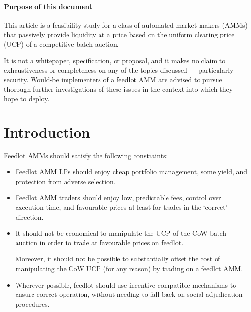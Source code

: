 \documentclass[a4paper,10pt]{article}
\begin{document}
\maketitle
\printsplash

\paragraph{Purpose of this document}

This article is a feasibility study for a class of automated market makers (AMMs) that passively provide liquidity at a price based on the uniform clearing price (UCP) of a competitive batch auction.

It is not a whitepaper, specification, or proposal, and it makes no claim to exhaustiveness or completeness on any of the topics discussed --- particularly security. 
%
Would-be implementers of a feedlot AMM are advised to pursue thorough further investigations of these issues in the context into which they hope to deploy.

\newpage
\section{Introduction}

Feedlot AMMs should satisfy the following constraints:
\begin{itemize}
  \item
    Feedlot AMM LPs should enjoy cheap portfolio management, some yield, and protection from adverse selection.
    
  \item
    Feedlot AMM traders should enjoy low, predictable fees, control over execution time, and favourable prices at least for trades in the `correct' direction.
    
  \item
    It should not be economical to manipulate the UCP of the CoW batch auction in order to trade at favourable prices on feedlot.
    
    Moreover, it should not be possible to substantially offset the cost of manipulating the CoW UCP (for any reason) by trading on a feedlot AMM.

  \item 
    Wherever possible, feedlot should use incentive-compatible mechanisms to ensure correct operation, without needing to fall back on social adjudication procedures.    
  
\end{itemize}
\end{document}
